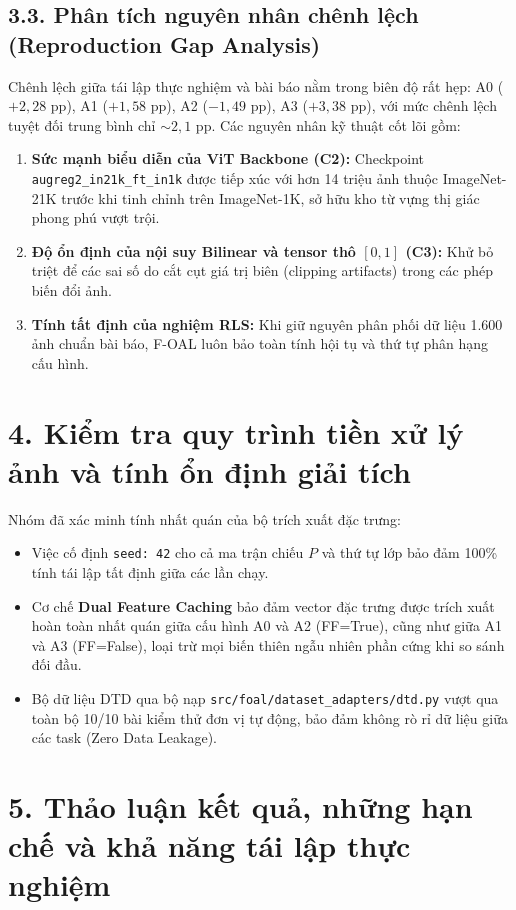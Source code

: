 \documentclass{article}
\begin{document}
\subsection{3.3. Phân tích nguyên nhân chênh lệch (Reproduction Gap Analysis)}
Chênh lệch giữa tái lập thực nghiệm và bài báo nằm trong biên độ rất hẹp: A0 ($+2,28\text{ pp}$), A1 ($+1,58\text{ pp}$), A2 ($-1,49\text{ pp}$), A3 ($+3,38\text{ pp}$), với mức chênh lệch tuyệt đối trung bình chỉ $\sim 2,1\text{ pp}$. Các nguyên nhân kỹ thuật cốt lõi gồm:
\begin{enumerate}
    \item \textbf{Sức mạnh biểu diễn của ViT Backbone (C2):} Checkpoint \texttt{augreg2\_in21k\_ft\_in1k} được tiếp xúc với hơn 14 triệu ảnh thuộc ImageNet-21K trước khi tinh chỉnh trên ImageNet-1K, sở hữu kho từ vựng thị giác phong phú vượt trội.
    \item \textbf{Độ ổn định của nội suy Bilinear và tensor thô $[0, 1]$ (C3):} Khử bỏ triệt để các sai số do cắt cụt giá trị biên (clipping artifacts) trong các phép biến đổi ảnh.
    \item \textbf{Tính tất định của nghiệm RLS:} Khi giữ nguyên phân phối dữ liệu 1.600 ảnh chuẩn bài báo, F-OAL luôn bảo toàn tính hội tụ và thứ tự phân hạng cấu hình.
\end{enumerate}

\section{4. Kiểm tra quy trình tiền xử lý ảnh và tính ổn định giải tích}
Nhóm đã xác minh tính nhất quán của bộ trích xuất đặc trưng:
\begin{itemize}
    \item Việc cố định \texttt{seed: 42} cho cả ma trận chiếu $P$ và thứ tự lớp bảo đảm 100\% tính tái lập tất định giữa các lần chạy.
    \item Cơ chế \textbf{Dual Feature Caching} bảo đảm vector đặc trưng được trích xuất hoàn toàn nhất quán giữa cấu hình A0 và A2 (FF=True), cũng như giữa A1 và A3 (FF=False), loại trừ mọi biến thiên ngẫu nhiên phần cứng khi so sánh đối đầu.
    \item Bộ dữ liệu DTD qua bộ nạp \texttt{src/foal/dataset\_adapters/dtd.py} vượt qua toàn bộ 10/10 bài kiểm thử đơn vị tự động, bảo đảm không rò rỉ dữ liệu giữa các task (Zero Data Leakage).
\end{itemize}

\section{5. Thảo luận kết quả, những hạn chế và khả năng tái lập thực nghiệm}
\end{document}
